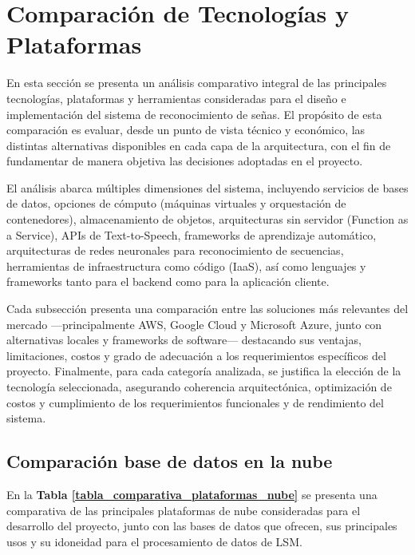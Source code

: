 \section{Comparación de Tecnologías y Plataformas}

En esta sección se presenta un análisis comparativo integral de las principales tecnologías, plataformas y herramientas consideradas para el diseño e implementación del sistema de reconocimiento de señas. El propósito de esta comparación es evaluar, desde un punto de vista técnico y económico, las distintas alternativas disponibles en cada capa de la arquitectura, con el fin de fundamentar de manera objetiva las decisiones adoptadas en el proyecto.

El análisis abarca múltiples dimensiones del sistema, incluyendo servicios de bases de datos, opciones de cómputo (máquinas virtuales y orquestación de contenedores), almacenamiento de objetos, arquitecturas sin servidor (Function as a Service), APIs de Text-to-Speech, frameworks de aprendizaje automático, arquitecturas de redes neuronales para reconocimiento de secuencias, herramientas de infraestructura como código (IaaS), así como lenguajes y frameworks tanto para el backend como para la aplicación cliente.

Cada subsección presenta una comparación entre las soluciones más relevantes del mercado —principalmente AWS, Google Cloud y Microsoft Azure, junto con alternativas locales y frameworks de software— destacando sus ventajas, limitaciones, costos y grado de adecuación a los requerimientos específicos del proyecto. Finalmente, para cada categoría analizada, se justifica la elección de la tecnología seleccionada, asegurando coherencia arquitectónica, optimización de costos y cumplimiento de los requerimientos funcionales y de rendimiento del sistema.

\subsection{Comparación base de datos en la nube}
En la \textbf{Tabla \ref{tabla_comparativa_plataformas_nube}} se presenta una comparativa de las principales plataformas de nube consideradas para el desarrollo del proyecto, junto con las bases de datos que ofrecen, sus principales usos y su idoneidad para el procesamiento de datos de LSM.

